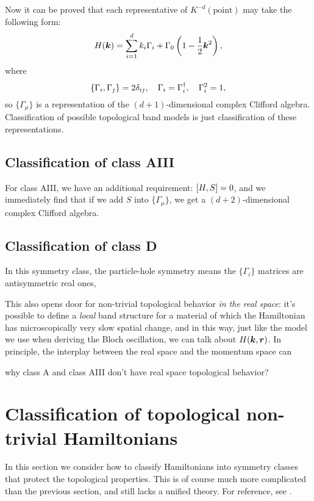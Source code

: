 \documentclass[hyperref, a4paper]{article}
\begin{document}
Now it can be proved that each representative of $K^{-d}(\text{point})$ may take the following form:
\begin{equation}
    H(\vb*{k}) = \sum_{i=1}^d k_i \Gamma_i + \Gamma_0 \left(1 - \frac{1}{2} \vb*{k}^2 \right),
\end{equation}
where 
\begin{equation}
    \acomm{\Gamma_i}{\Gamma_j} = 2 \delta_{ij}, \quad \Gamma_i = \Gamma_i^\dagger , \quad \Gamma_i^2 = 1,
\end{equation}
so $\{\Gamma_\mu \}$ is a representation of the $(d+1)$-dimensional complex Clifford algebra. Classification of 
possible topological band models is just classification of these representations.

\subsection{Classification of class AIII}

For class AIII, we have an additional requirement: $\comm{H}{S} = 0$, and we immediately find that 
if we add $S$ into $\{ \Gamma_\mu \}$, we get a $(d+2)$-dimensional complex Clifford algebra.

\subsection{Classification of class D}

In this symmetry class, the particle-hole symmetry means the $\{\Gamma_i\}$ matrices are antisymmetric real ones,

This also opens door for non-trivial topological behavior \emph{in the real space}: it's possible to define 
a \emph{local} band structure for a material of which the Hamiltonian has microscopically very slow spatial change,
and in this way, just like the model we use when deriving the Bloch oscillation, we can talk about 
$H(\vb*{k}, \vb*{r})$. In principle, the interplay between the real space and the momentum space can 

why class A and class AIII don't have real space topological behavior?

\section{Classification of topological non-trivial Hamiltonians}

In this section we consider how to classify Hamiltonians into symmetry classes that protect the topological 
properties. This is of course much more complicated than the previous section, and still lacks a unified theory. 
For reference, see \cite{RevModPhys.88.035005}.
\end{document}
